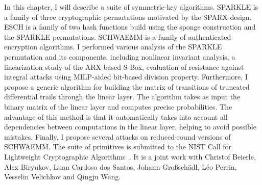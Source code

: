 \myminitoc

In this chapter, I will describe a suite of symmetric-key algorithms. SPARKLE is a family of three cryptographic permutations motivated by the SPARX design. ESCH is a family of two hash functions build using the sponge construction and the SPARKLE permutations. SCHWAEMM is a family of authenticated encryption algorithms.
I performed various analysis of the SPARKLE permutation and its components, including nonlinear invariant analysis, a linearization study of the ARX-based S-Box, evaluation of resistance against integral attacks using MILP-aided bit-based division property. Furthermore, I propose a generic algorithm for building the matrix of transitions of truncated differential trails through the linear layer. The algorithm takes as input the binary matrix of the linear layer and computes precise probabilities. The advantage of this method is that it automatically takes into account all dependencies between computations in the linear layer, helping to avoid possible mistakes. Finally, I propose several attacks on reduced-round versions of SCHWAEMM.
The suite of primitives is submitted to the NIST Call for Lightweight Cryptographic Algorithms~\cite{NISTlight}. It is a joint work with Christof Beierle, Alex Biryukov, Luan Cardoso dos Santos, Johann Großschädl, Léo Perrin, Vesselin Velichkov and Qingju Wang.